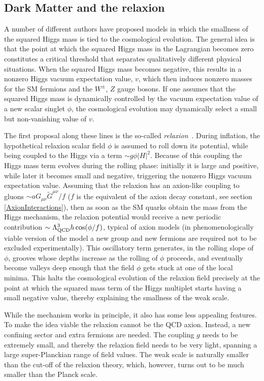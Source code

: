 \subsection{Dark Matter and the relaxion} \label{sec:relaxion}
A number of different authors have proposed models in which the smallness of the squared Higgs mass is tied to the cosmological evolution.
The general idea is that the point at which the squared Higgs mass in the Lagrangian becomes zero constitutes a critical threshold that separates qualitatively different physical situations. 
When the squared Higgs mass becomes negative, this results in a nonzero Higgs vacuum expectation value, $v$, 
which then induces nonzero
masses for the SM fermions and the $W^\pm$, $Z$ gauge bosons. 
If one assumes that the squared Higgs mass is dynamically controlled by the vacuum expectation value of a new scalar singlet $\phi$, 
 the  cosmological evolution may dynamically select a small but non-vanishing value of $v$.

\smallskip

The first proposal along these lines  is the so-called {\em relaxion}~\cite{relaxion}. During inflation,
the hypothetical relaxion scalar field $\phi$ is assumed to roll down its potential, while being coupled to the Higgs via a term $\sim g  \phi |H|^2$. 
Because of this coupling the Higgs mass term evolves during the rolling phase: initially it is large and positive, while later it becomes small and negative, triggering the nonzero Higgs vacuum expectation value. 
Assuming that the relaxion has an axion-like coupling to gluons $\sim a G_{\mu\nu}\tilde{G}^{\mu\nu}/f$
($f$ is the equivalent of the axion decay constant, see section \ref{AxionInteractions}), then as soon as the SM quarks obtain the mass 
 from the Higgs mechanism,
the relaxion potential would receive a new periodic contribution $\sim \Lambda_{\rm QCD}^3 h \cos(\phi/f)$, typical of axion models (in phenomenologically viable version of the model a new group and new fermions are required not to be excluded experimentally).
This oscillatory term generates, in the rolling slope of $\phi$, grooves whose depths increase as the rolling of $\phi$ proceeds, and eventually become valleys deep enough that the field $\phi$ gets stuck at one of the local minima. This halts the cosmological evolution of the relaxion field precisely at the point at which the squared mass term of the Higgs multiplet starts having a small negative value, thereby explaining the smallness of the weak scale.

While the mechanism works in principle, it also has some less appealing features.
To make the idea viable the relaxion cannot be the QCD axion. Instead, a new confining sector and extra fermions are needed.
The coupling $g$ needs to be extremely small, and thereby the relaxion field needs to be very light, spanning a large super-Planckian  range of field values.
The weak scale is naturally smaller than the cut-off of the relaxion theory, which, however, turns out to be much smaller than the Planck scale.


